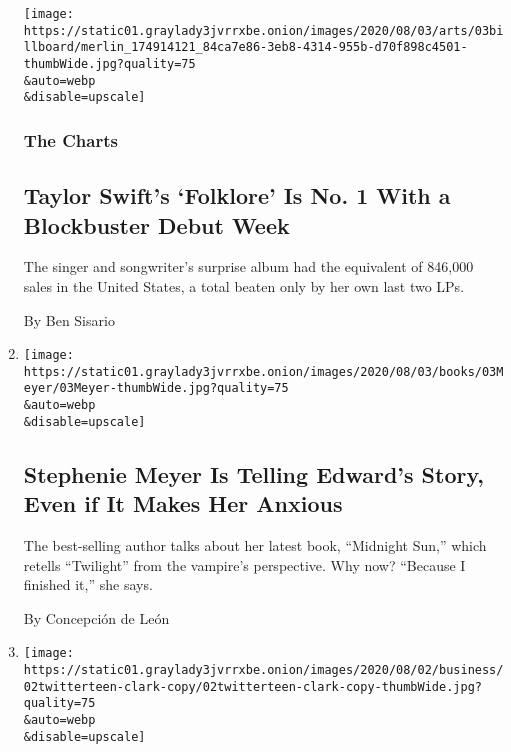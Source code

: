\begin{enumerate}
  \texttt{[image: https://static01.graylady3jvrrxbe.onion/images/2020/08/03/arts/03billboard/merlin\_174914121\_84ca7e86-3eb8-4314-955b-d70f898c4501-thumbWide.jpg?quality=75\\\&auto=webp\\\&disable=upscale]}

  \hypertarget{the-charts}{%
  \subsubsection{The Charts}\label{the-charts}}

  \hypertarget{taylor-swifts-folklore-is-no-1-with-a-blockbuster-debut-week}{%
  \subsection{Taylor Swift's `Folklore' Is No. 1 With a Blockbuster
  Debut
  Week}\label{taylor-swifts-folklore-is-no-1-with-a-blockbuster-debut-week}}

  The singer and songwriter's surprise album had the equivalent of
  846,000 sales in the United States, a total beaten only by her own
  last two LPs.

  By Ben Sisario
\item
  \href{/2020/08/03/books/midnight-sun-stephenie-meyer-twilight.html}{}

  \texttt{[image: https://static01.graylady3jvrrxbe.onion/images/2020/08/03/books/03Meyer/03Meyer-thumbWide.jpg?quality=75\\\&auto=webp\\\&disable=upscale]}

  \hypertarget{stephenie-meyer-is-telling-edwards-story-even-if-it-makes-her-anxious}{%
  \subsection{Stephenie Meyer Is Telling Edward's Story, Even if It
  Makes Her
  Anxious}\label{stephenie-meyer-is-telling-edwards-story-even-if-it-makes-her-anxious}}

  The best-selling author talks about her latest book, ``Midnight Sun,''
  which retells ``Twilight'' from the vampire's perspective. Why now?
  ``Because I finished it,'' she says.

  By Concepción de León
\item
  \href{/2020/08/02/technology/florida-teenager-twitter-hack.html}{}

  \texttt{[image: https://static01.graylady3jvrrxbe.onion/images/2020/08/02/business/02twitterteen-clark-copy/02twitterteen-clark-copy-thumbWide.jpg?quality=75\\\&auto=webp\\\&disable=upscale]}


\end{enumerate}
